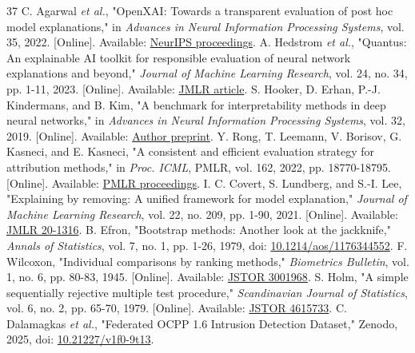 \documentclass[conference,letterpaper]{IEEEtran}
\begin{document}
\begin{thebibliography}{37}
 C. Agarwal \emph{et al.}, "OpenXAI: Towards a transparent evaluation of post hoc model explanations," in \emph{Advances in Neural Information Processing Systems}, vol. 35, 2022. [Online]. Available: \href{https://papers.neurips.cc/paper_files/paper/2022/file/65398a0eba88c9b4a1c38ae405b125ef-Paper-Datasets_and_Benchmarks.pdf}{NeurIPS proceedings}.
 A. Hedstrom \emph{et al.}, "Quantus: An explainable AI toolkit for responsible evaluation of neural network explanations and beyond," \emph{Journal of Machine Learning Research}, vol. 24, no. 34, pp. 1-11, 2023. [Online]. Available: \href{https://jmlr.org/papers/v24/22-0142.html}{JMLR article}.
 S. Hooker, D. Erhan, P.-J. Kindermans, and B. Kim, "A benchmark for interpretability methods in deep neural networks," in \emph{Advances in Neural Information Processing Systems}, vol. 32, 2019. [Online]. Available: \href{https://arxiv.org/abs/1806.10758}{Author preprint}.
 Y. Rong, T. Leemann, V. Borisov, G. Kasneci, and E. Kasneci, "A consistent and efficient evaluation strategy for attribution methods," in \emph{Proc. ICML}, PMLR, vol. 162, 2022, pp. 18770-18795. [Online]. Available: \href{https://proceedings.mlr.press/v162/rong22a.html}{PMLR proceedings}.
 I. C. Covert, S. Lundberg, and S.-I. Lee, "Explaining by removing: A unified framework for model explanation," \emph{Journal of Machine Learning Research}, vol. 22, no. 209, pp. 1-90, 2021. [Online]. Available: \href{https://jmlr.org/papers/v22/20-1316.html}{JMLR 20-1316}.
 B. Efron, "Bootstrap methods: Another look at the jackknife," \emph{Annals of Statistics}, vol. 7, no. 1, pp. 1-26, 1979, doi: \href{https://doi.org/10.1214/aos/1176344552}{10.1214/aos/1176344552}.
 F. Wilcoxon, "Individual comparisons by ranking methods," \emph{Biometrics Bulletin}, vol. 1, no. 6, pp. 80-83, 1945. [Online]. Available: \href{https://www.jstor.org/stable/3001968}{JSTOR 3001968}.
 S. Holm, "A simple sequentially rejective multiple test procedure," \emph{Scandinavian Journal of Statistics}, vol. 6, no. 2, pp. 65-70, 1979. [Online]. Available: \href{https://www.jstor.org/stable/4615733}{JSTOR 4615733}.
 C. Dalamagkas \emph{et al.}, "Federated OCPP 1.6 Intrusion Detection Dataset," Zenodo, 2025, doi: \href{https://doi.org/10.21227/v1f0-9t13}{10.21227/v1f0-9t13}.
\end{thebibliography}
\end{document}
